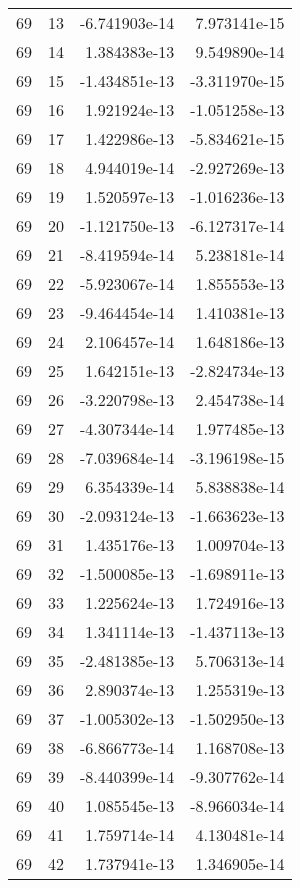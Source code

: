 \begin{tabular}{rrrr}
  69 &   13 & -6.741903e-14 &  7.973141e-15 \\
  69 &   14 &  1.384383e-13 &  9.549890e-14 \\
  69 &   15 & -1.434851e-13 & -3.311970e-15 \\
  69 &   16 &  1.921924e-13 & -1.051258e-13 \\
  69 &   17 &  1.422986e-13 & -5.834621e-15 \\
  69 &   18 &  4.944019e-14 & -2.927269e-13 \\
  69 &   19 &  1.520597e-13 & -1.016236e-13 \\
  69 &   20 & -1.121750e-13 & -6.127317e-14 \\
  69 &   21 & -8.419594e-14 &  5.238181e-14 \\
  69 &   22 & -5.923067e-14 &  1.855553e-13 \\
  69 &   23 & -9.464454e-14 &  1.410381e-13 \\
  69 &   24 &  2.106457e-14 &  1.648186e-13 \\
  69 &   25 &  1.642151e-13 & -2.824734e-13 \\
  69 &   26 & -3.220798e-13 &  2.454738e-14 \\
  69 &   27 & -4.307344e-14 &  1.977485e-13 \\
  69 &   28 & -7.039684e-14 & -3.196198e-15 \\
  69 &   29 &  6.354339e-14 &  5.838838e-14 \\
  69 &   30 & -2.093124e-13 & -1.663623e-13 \\
  69 &   31 &  1.435176e-13 &  1.009704e-13 \\
  69 &   32 & -1.500085e-13 & -1.698911e-13 \\
  69 &   33 &  1.225624e-13 &  1.724916e-13 \\
  69 &   34 &  1.341114e-13 & -1.437113e-13 \\
  69 &   35 & -2.481385e-13 &  5.706313e-14 \\
  69 &   36 &  2.890374e-13 &  1.255319e-13 \\
  69 &   37 & -1.005302e-13 & -1.502950e-13 \\
  69 &   38 & -6.866773e-14 &  1.168708e-13 \\
  69 &   39 & -8.440399e-14 & -9.307762e-14 \\
  69 &   40 &  1.085545e-13 & -8.966034e-14 \\
  69 &   41 &  1.759714e-14 &  4.130481e-14 \\
  69 &   42 &  1.737941e-13 &  1.346905e-14 \\

\end{tabular}
